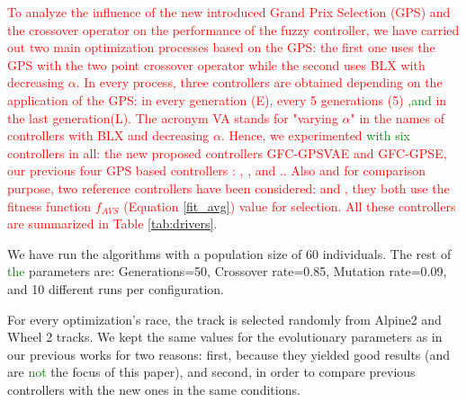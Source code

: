 \documentclass[10pt,journal,compsoc]{IEEEtran}
\begin{document}
\textcolor{red}{
To analyze the influence of the new introduced Grand Prix Selection
(GPS) and the crossover operator on the performance of the fuzzy
controller, we have carried out two main optimization processes based
on the GPS: the first one uses the GPS with the two point crossover
operator while the second uses  BLX with decreasing $\alpha$.
In every process, three controllers are obtained depending on the application of the GPS: in every generation (E), every 5 generations (5)  \textcolor{green}{,and} in the last generation(L). The acronym VA  stands for "varying $\alpha$" in the names of  controllers with BLX and decreasing $\alpha$.
Hence, we experimented  \textcolor{green}{ with six} controllers in all: the new
proposed controllers {\sf GFC-GPSVAE} and {\sf GFC-GPSE}, our previous four GPS based controllers \cite{DBLP:conf/cig/SalemMG19}: {}, {},{} and {}..
Also and for comparison purpose, two reference controllers have been considered: {}\cite{DBLP:conf/cig/SalemMG19} and {}\cite{salem_cig2018}, they both use the fitness function $f_{AVS}$ (Equation \ref{fit_avg}) value for selection.
All these controllers are summarized in Table \ref{tab:drivers}. 
}

We have run the algorithms with a population size of 60
individuals. The rest of  \textcolor{green}{the} parameters are: Generations=50, Crossover
rate=0.85, Mutation rate=0.09, and 10 different runs per
configuration. %
              
For every optimization's race, the track is selected randomly from Alpine2 and Wheel 2 tracks.
We kept the same values for the evolutionary parameters as in our previous works for two reasons: first, because they yielded good results (and are  \textcolor{green}{not} the focus of this paper), and second, in order to compare previous controllers with the new ones in the same conditions.
\end{document}
